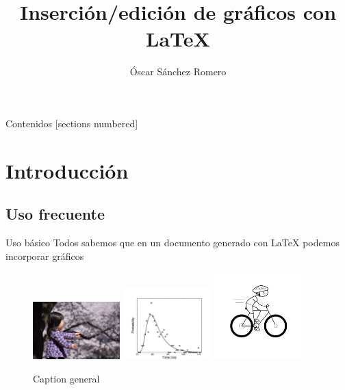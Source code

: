 \documentclass[10pt]{beamer}
\title{Inserción/edición 
de 
gráficos con \LaTeX{}}
\date{}
\author{Óscar Sánchez Romero}
\institute{Dpto. Matemática Aplicada, UGR}
\begin{document}
\maketitle

\begin{frame}{Contenidos}
  [sections numbered]
  \tableofcontents[hideallsubsections]
\end{frame}

\section{Introducción}

\subsection{Uso frecuente}
\begin{frame}[fragile]{Uso básico}
Todos sabemos que en un documento generado con \LaTeX{} podemos incorporar  gráficos  
\begin{figure}[h]
\includegraphics[width=0.3\textwidth]{./graficos/sorpresa.jpg} 
\includegraphics[width=0.3\textwidth]{./graficos/fig_9Vis.pdf}
\includegraphics[width=0.3\textwidth]{./graficos/ciclista.png}
\caption{Caption general}
\label{figGeneral}
\end{figure}
\end{frame}
\end{document}
